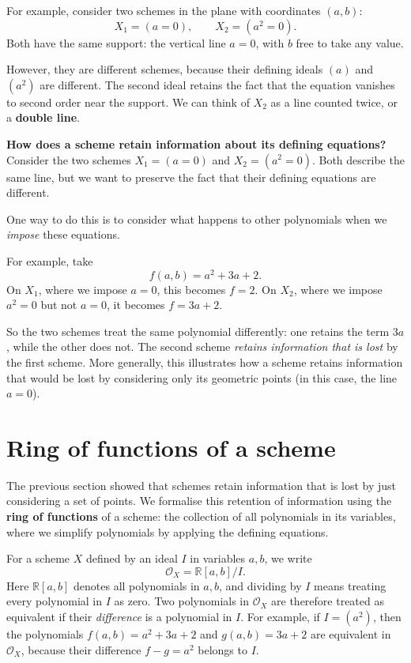 \documentclass[12pt]{article}
\begin{document}
For example, consider two schemes in the plane with
coordinates $(a,b)$:
\[
X_1=(a=0), \qquad X_2=(a^2=0).
\]
Both have the same support: the vertical
line $a=0$, with $b$ free to take any value.

However, they are different schemes, because their defining
ideals $(a)$ and $(a^2)$ are different. The second ideal retains
the fact that the equation vanishes to second order near the support.
We can think of $X_2$ as a line counted twice, or a
\textbf{double line}.

\textbf{How does a scheme retain information about its defining equations?} Consider the two schemes $X_1=(a=0)$ and $X_2=(a^2=0)$.
Both describe the same line, but we want to preserve the fact
that their defining equations are different.

One way to do this is to consider what happens to other
polynomials when we \emph{impose} these equations.

For example, take
\[
f(a,b)=a^2+3a+2.
\]
On $X_1$, where we impose $a=0$, this becomes $f=2$.
On $X_2$, where we impose $a^2=0$ but not $a=0$,
it becomes $f=3a+2$.

So the two schemes treat the same polynomial differently:
one retains the term $3a$, while the other does not. The second scheme \emph{retains information that is lost} by the first scheme.
More generally, this illustrates how a scheme retains information that
would be lost by considering only its geometric points (in this case, the line $a=0$).

\newpage
\section{Ring of functions of a scheme}\label{Ring of functions of a scheme}

The previous section showed that schemes retain information that is lost by just considering a set of points. We formalise this retention of information using the \textbf{ring of functions}
of a scheme: the collection of all polynomials in its
variables, where we simplify polynomials by applying the defining
equations.

For a scheme $X$ defined by an ideal $I$ in variables
$a,b$, we write
\[
\mathcal{O}_X=\mathbb{R}[a,b]/I.
\]
Here $\mathbb{R}[a,b]$ denotes all polynomials in $a,b$,
and dividing by $I$ means treating every polynomial
in $I$ as zero. Two polynomials in $\mathcal{O}_X$ are therefore treated
as equivalent if their \emph{difference} is a polynomial in $I$.
For example, if $I=(a^2)$, then the polynomials
$f(a,b)=a^2+3a+2$ and $g(a,b)=3a+2$ are equivalent
in $\mathcal{O}_X$, because their difference
$f-g=a^2$ belongs to $I$.
\end{document}
